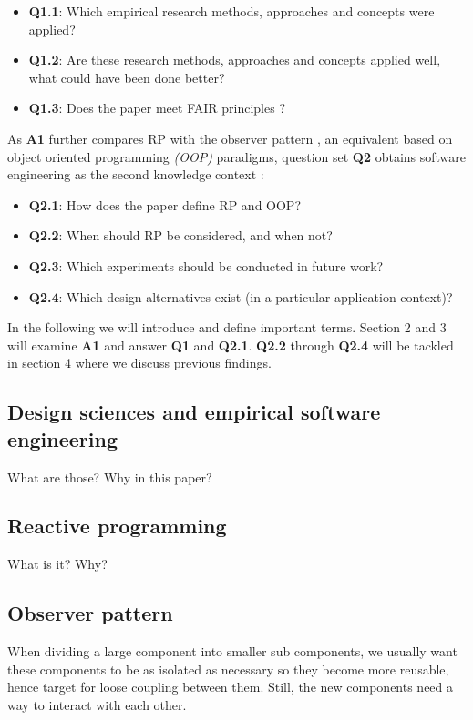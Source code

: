 \documentclass[11pt,a4paper,twocolumn]{article}
\begin{document}
	\begin{itemize}
		\item \textbf{Q1.1}: Which empirical research methods, approaches and concepts were applied?
		\item \textbf{Q1.2}: Are these research methods, approaches and concepts applied well, what could have been done better?
		\item \textbf{Q1.3}: Does the paper meet FAIR principles \cite{2019arXiv190805986H} \cite{wilkinson:2016}?
	\end{itemize}

	As \textbf{A1} further compares RP with the observer pattern \cite{gamma1995design}, an equivalent based on object oriented programming \emph{(OOP)} paradigms, question set \textbf{Q2} obtains software engineering as the second knowledge context \cite{balestra:2019:designscience:articactandcontext}:

	\begin{itemize}
		\item \textbf{Q2.1}: How does the paper define RP and OOP?
		\item \textbf{Q2.2}: When should RP be considered, and when not?
		\item \textbf{Q2.3}: Which experiments should be conducted in future work?
		\item \textbf{Q2.4}: Which design alternatives exist (in a particular application context)?
	\end{itemize}

	In the following we will introduce and define important terms. Section 2 and 3 will examine \textbf{A1} and answer \textbf{Q1} and \textbf{Q2.1}. \textbf{Q2.2} through \textbf{Q2.4} will be tackled in section 4 where we discuss previous findings.

	\subsection{Design sciences and empirical software engineering}
	What are those? Why in this paper?

	\subsection{Reactive programming}
	What is it? Why?

	\subsection{Observer pattern}
	When dividing a large component into smaller sub components, we usually want these components to be as isolated as necessary so they become more reusable, hence target for loose coupling between them. Still, the new components need a way to interact with each other.
\end{document}
